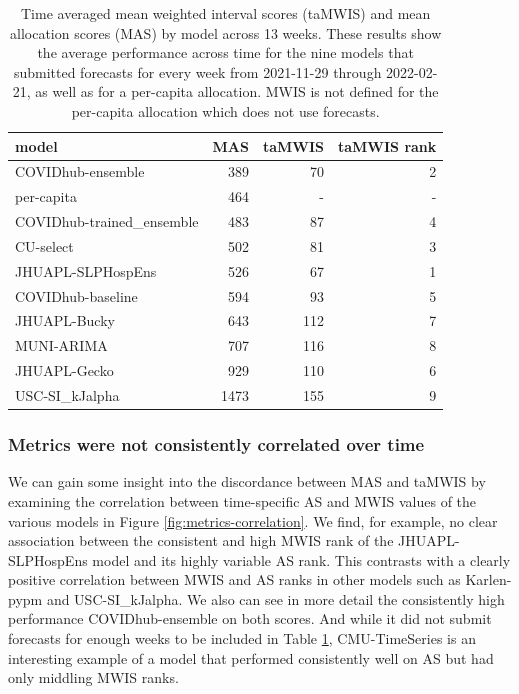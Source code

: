 \documentclass{article}\usepackage[]{graphicx}\usepackage[]{xcolor}
\begin{document}
\begin{table}[ht]
\centering
\begin{tabular}{lrrr}
  \hline
model & MAS & taMWIS & taMWIS rank \\ 
  \hline
COVIDhub-ensemble & 389 & 70 & 2 \\ 
  per-capita & 464 & - & - \\ 
  COVIDhub-trained\_ensemble & 483 & 87 & 4 \\ 
  CU-select & 502 & 81 & 3 \\ 
  JHUAPL-SLPHospEns & 526 & 67 & 1 \\ 
  COVIDhub-baseline & 594 & 93 & 5 \\ 
  JHUAPL-Bucky & 643 & 112 & 7 \\ 
  MUNI-ARIMA & 707 & 116 & 8 \\ 
  JHUAPL-Gecko & 929 & 110 & 6 \\ 
  USC-SI\_kJalpha & 1473 & 155 & 9 \\ 
   \hline
\end{tabular}
\caption{Time averaged mean weighted interval scores (taMWIS) and mean allocation scores (MAS) by model across 13 weeks. These results show the average performance across time for the nine models that submitted forecasts for every week from 2021-11-29 through 2022-02-21, as well
  as for a per-capita allocation. MWIS is not defined for the per-capita allocation which does not use forecasts.} 
\label{tab:multi-week-performance-summary}
\end{table}


\subsubsection{Metrics were not consistently correlated over time}

We can gain some insight into the discordance between MAS and taMWIS by examining the correlation between time-specific AS and MWIS values of the various models in Figure
\ref{fig:metrics-correlation}. We find, for example, no clear association between the consistent
and high MWIS rank of the JHUAPL-SLPHospEns model and its highly variable AS rank. This contrasts 
with a clearly positive correlation between MWIS and AS ranks in other models such as 
Karlen-pypm and USC-SI\_kJalpha.
We also can see in more detail the consistently high performance COVIDhub-ensemble on both scores.
And while it did not submit forecasts for enough weeks to be included in Table \ref{tab:multi-week-performance-summary}, CMU-TimeSeries is an interesting example of a model that 
performed consistently well on AS but had only middling MWIS ranks.
\end{document}
